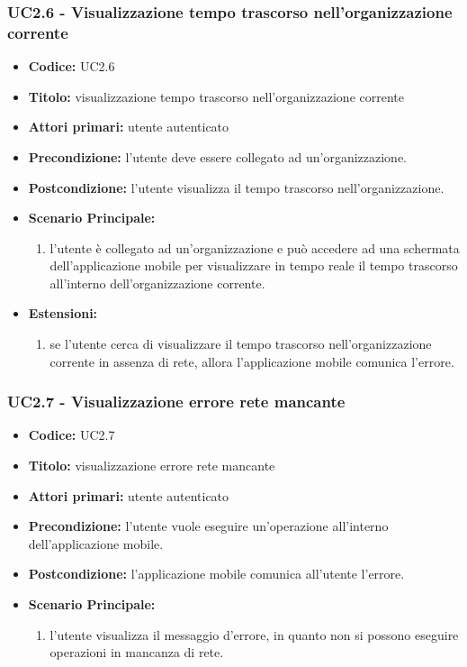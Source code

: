 \documentclass[../analisi-dei-requisiti]{subfiles}
\begin{document}
\subsubsection{UC2.6 - Visualizzazione tempo trascorso nell'organizzazione corrente}
\label{sub:uc2.1utente}
\begin{itemize}
  \item \textbf{Codice:} UC2.6
  \item \textbf{Titolo:} visualizzazione tempo trascorso nell'organizzazione corrente
  \item \textbf{Attori primari:} utente autenticato
  \item \textbf{Precondizione:} l'utente deve essere collegato ad un'organizzazione.
  \item \textbf{Postcondizione:} l'utente visualizza il tempo trascorso nell'organizzazione.
  \item \textbf{Scenario Principale:}
  \begin{enumerate}
    \item l'utente è collegato ad un'organizzazione e può accedere ad una schermata dell'applicazione mobile per visualizzare in tempo reale il tempo trascorso all'interno 
    dell'organizzazione corrente.
  \end{enumerate}
  \item \textbf{Estensioni:} 
  \begin{enumerate}
    \item se l'utente cerca di visualizzare il tempo trascorso nell'organizzazione corrente in assenza di rete, allora l'applicazione mobile comunica l'errore.
  \end{enumerate}
\end{itemize}

\subsubsection{UC2.7 - Visualizzazione errore rete mancante}
\label{sub:uc2.1utente}
\begin{itemize}
  \item \textbf{Codice:} UC2.7
  \item \textbf{Titolo:} visualizzazione errore rete mancante
  \item \textbf{Attori primari:} utente autenticato
  \item \textbf{Precondizione:} l'utente vuole eseguire un'operazione all'interno dell'applicazione mobile.
  \item \textbf{Postcondizione:} l'applicazione mobile comunica all'utente l'errore.
  \item \textbf{Scenario Principale:}
  \begin{enumerate}
    \item l'utente visualizza il messaggio d'errore, in quanto non si possono eseguire operazioni in mancanza di rete.
  \end{enumerate}
\end{itemize}
\end{document}
